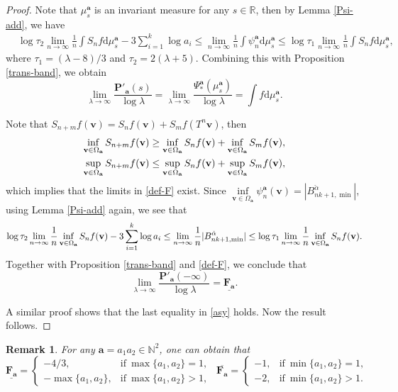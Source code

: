 \documentclass[reqno,11pt,graphicx,]{amsart}
\numberwithin{equation}{section}
\theoremstyle{plain}
\newcommand{\N}{{\mathbb N}}
\newcommand{\R}{{\mathbb R}}
\newcommand{\p}{\mathbf P}
\newcommand{\3}{\mathbf{3}}
\newcommand{\ma}{\mathbf{a}}
\newcommand{\mv}{\mathbf{v}}
\newtheorem{remark}[theorem]{Remark}
\begin{document}
	\begin{proof}
		Note that $\mu^{\ma}_s$ is an invariant measure for any $s\in\R$, then by Lemma \ref{Psi-add}, we have 
		\begin{align*}
			&\log\tau_2\lim\limits_{n\to\infty}\frac{1}{n}\int S_nf\mathrm{d}\mu^{\ma}_{s}-3\sum_{i=1}^{k}\log a_i \leq\lim\limits_{n\to\infty}\frac{1}{n}\int\psi^{\ma}_n\mathrm{d}\mu^{\ma}_{s}\leq\log%
			\tau_1\lim\limits_{n\to\infty}\frac{1}{n}\int S_nf\mathrm{d}\mu^{\ma}_{s},
		\end{align*}
		where $\tau_{1}=(\lambda -8)/3$ and $\tau
		_{2}=2(\lambda +5)$. Combining this with Proposition \ref{trans-band}, we obtain 
		\begin{equation*}
			\lim\limits_{\lambda \rightarrow \infty }\frac{\p'_{\ma}(s)}{\log
				\lambda }=\lim\limits_{\lambda\to\infty}\frac{\Psi^{\ma}_*(\mu^{\ma}_{s})}{\log\lambda}=\int
			f\mathrm{d}\mu^{\ma}_{s}.
		\end{equation*}	
		
		Note that $S_{n+m}f(\mv)=S_{n}f(\mv)+S_{m}f(T^n\mv)$, then
		\begin{align*}
			\inf_{\mv\in\Omega_{\ma}}S_{n+m}f(\mv)\geq\inf_{\mv\in\Omega_{\ma}}S_nf(\mv)+\inf_{\mv \in\Omega_{\ma}}S_{m}f(\mv), \\
			\sup_{\mv\in\Omega_{\ma}}S_{n+m}f(\mv)\leq\sup_{\mv\in\Omega_{\ma}}S_nf(\mv)+\sup_{\mv\in\Omega_{\mathbf{%
						a}}}S_{m}f(\mv),
		\end{align*}
		which implies that the limits in \eqref{def-F} exist. Since $\inf\limits_{\mv \in\Omega_{\ma}}\psi^{\ma}_n(\mv)=|B^{\check{\alpha}}_{nk+1,\min}|$, using Lemma \ref{Psi-add} again, we see that 
		\begin{align*}
			\log\tau_2\lim_{n\to\infty}\frac{1}{n}\inf_{\mv\in\Omega_{%
					\mathbf{a}}}S_nf(\mv)-3\sum_{i=1}^{k}\log a_i
			\leq\lim_{n\to\infty}\frac{1}{n}|B^{\check{\alpha}}_{nk+1,\min}|\leq\log\tau_1\lim_{n\to\infty}\frac{1%
			}{n}\inf_{\mv\in\Omega_{\ma}}S_nf(\mv).
		\end{align*}
		Together with Proposition \ref{trans-band} and \eqref{def-F}, we conclude that 
		\begin{equation*}
			\lim\limits_{\lambda\to\infty}\frac{\p'_{\ma}(-\infty)}{\log\lambda}=\underline{\mathbf{F}_{\ma}}.
		\end{equation*}
		
		A	similar proof shows that the last equality in \eqref{asy} holds. Now the result follows.
	\end{proof}
	\begin{remark}\label{asy-constant}
		For any $\ma=a_1a_2\in\N^2$, one can obtain that
		\begin{equation*}
			\underline{\mathbf{F}_{\ma}}=\begin{cases}
				-4/3,&\text{if}\ \max\{a_1,a_2\}=1,\\
				-\max\{a_1,a_2\},&\text{if}\ \max\{a_1,a_2\}>1,
			\end{cases}\ \ 
			\overline{\mathbf{F}_{\ma}}=\begin{cases}
				-1,&\text{if}\ \min\{a_1,a_2\}=1,\\
				-2, &\text{if}\ \min\{a_1,a_2\}>1.
			\end{cases}
		\end{equation*}
	\end{remark}
\end{document}
